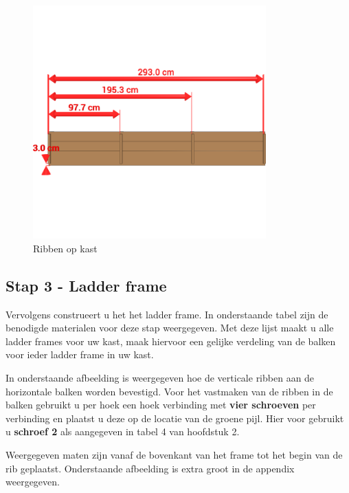 \documentclass{article}
\begin{document}
\begin{figure}[h!]
    \centering
    \includegraphics[width=0.8\textwidth]{scene 2 - bottom rib.png}
    \caption{Ribben op kast}
    \label{fig:stap 2}
\end{figure}

\clearpage
\newpage

\subsection{Stap 3 - Ladder frame}

Vervolgens construeert u het het ladder frame. In onderstaande tabel zijn de benodigde materialen voor deze stap weergegeven. Met deze lijst maakt u alle ladder frames voor uw kast, maak hiervoor een gelijke verdeling van de balken voor ieder ladder frame in uw kast.



In onderstaande afbeelding is weergegeven hoe de verticale ribben aan de horizontale balken worden bevestigd. Voor het vastmaken van de ribben in de balken gebruikt u per hoek een hoek verbinding met \textbf{vier schroeven} per verbinding en plaatst u deze op de locatie van de groene pijl. Hier voor gebruikt u \textbf{schroef 2} als aangegeven in tabel 4 van hoofdstuk 2.

Weergegeven maten zijn vanaf de bovenkant van het frame tot het begin van de rib geplaatst. Onderstaande afbeelding is extra groot in de appendix weergegeven.
\end{document}
